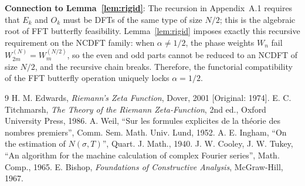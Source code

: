 \documentclass[12pt,a4paper]{amsart}
\theoremstyle{plain}
\theoremstyle{definition}
\theoremstyle{remark}
\begin{document}
\textbf{Connection to Lemma~\ref{lem:rigid}}: The recursion in Appendix~A.1 requires that $E_k$ and $O_k$ must be DFTs of the same type of size $N/2$; this is the algebraic root of FFT butterfly feasibility. Lemma~\ref{lem:rigid} imposes exactly this recursive requirement on the NCDFT family: when $\alpha\neq 1/2$, the phase weights $W_n$ fail $W_{2m}^{(N)}=W_m^{(N/2)}$, so the even and odd parts cannot be reduced to an NCDFT of size $N/2$, and the recursive chain breaks. Therefore, the functorial compatibility of the FFT butterfly operation uniquely locks $\alpha=1/2$.

\begin{thebibliography}{9}
 H. M. Edwards, \textit{Riemann's Zeta Function}, Dover, 2001 [Original: 1974].
 E. C. Titchmarsh, \textit{The Theory of the Riemann Zeta-Function}, 2nd ed., Oxford University Press, 1986.
 A. Weil, ``Sur les formules explicites de la th\'eorie des nombres premiers'', Comm. Sem. Math. Univ. Lund, 1952.
 A. E. Ingham, ``On the estimation of $N(\sigma,T)$'', Quart. J. Math., 1940.
 J. W. Cooley, J. W. Tukey, ``An algorithm for the machine calculation of complex Fourier series'', Math. Comp., 1965.
 E. Bishop, \textit{Foundations of Constructive Analysis}, McGraw-Hill, 1967.
\end{thebibliography}
\end{document}

